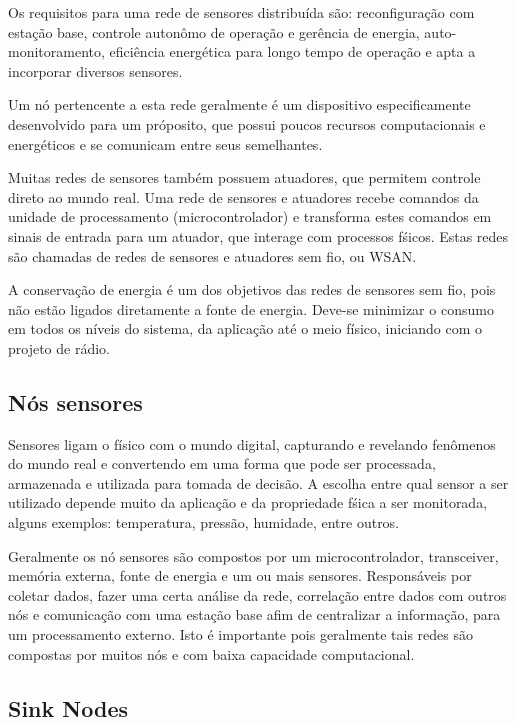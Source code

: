 Os requisitos para uma rede de sensores distribu\'ida s\~ao: reconfigura\c{c}\~ao com esta\c{c}\~ao base, controle auton\^omo de opera\c{c}\~ao e ger\^encia de energia, auto-monitoramento, efici\^encia energ\'etica para longo tempo de opera\c{c}\~ao e apta a incorporar diversos sensores.\cite{542724}

Um n\'o pertencente a esta rede geralmente \'e um dispositivo especificamente desenvolvido para um pr\'oposito, que possui poucos recursos computacionais e energ\'eticos e se comunicam entre seus semelhantes.

Muitas redes de sensores tamb\'em possuem atuadores, que permitem controle direto ao mundo real. Uma rede de sensores e atuadores recebe comandos da unidade de processamento (microcontrolador) e transforma estes comandos em sinais de entrada para um atuador, que interage com processos f\'sicos. Estas redes s\~ao chamadas de redes de sensores e atuadores sem fio, ou WSAN.

A conserva\c{c}\~ao de energia \'e um dos objetivos das redes de sensores sem fio, pois n\~ao est\~ao ligados diretamente a fonte de energia. Deve-se minimizar o consumo em todos os n\'iveis do sistema, da aplica\c{c}\~ao at\'e o meio f\'isico, iniciando com o projeto de r\'adio. \cite{WsnSurvey2008} 

\subsection{N\'os sensores}
Sensores ligam o f\'isico com o mundo digital, capturando e revelando fen\^omenos do mundo real e convertendo em uma forma que pode ser processada, armazenada e utilizada para tomada de decis\~ao. A escolha entre qual sensor a ser utilizado depende muito da aplica\c{c}\~ao e da propriedade f\'sica a ser monitorada, alguns exemplos: temperatura, press\~ao, humidade, entre outros.

Geralmente os n\'o sensores s\~ao compostos por um microcontrolador, transceiver, mem\'oria externa, fonte de energia e um ou mais sensores. Respons\'aveis por coletar dados, fazer uma certa an\'alise da rede, correla\c{c}\~ao entre dados com outros n\'os e comunica\c{c}\~ao com uma esta\c{c}\~ao base afim de centralizar a informa\c{c}\~ao, para um processamento externo. Isto \'e importante pois geralmente tais redes s\~ao compostas por muitos n\'os e com baixa capacidade computacional. \cite{dargie2010fundamentals}

\subsection{Sink Nodes}

